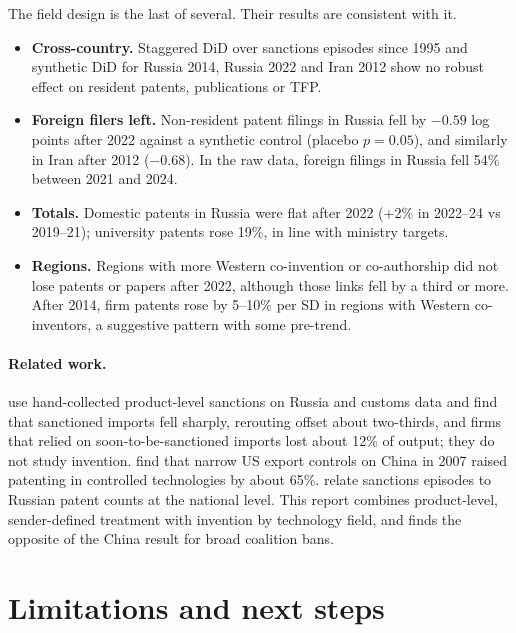 \documentclass[11pt,a4paper]{article}
\begin{document}
The field design is the last of several. Their results are consistent with it.
\begin{itemize}\setlength\itemsep{0.1em}
  \item \textbf{Cross-country.} Staggered DiD over sanctions episodes since 1995 and synthetic DiD for Russia 2014,
  Russia 2022 and Iran 2012 show no robust effect on resident patents, publications or TFP.
  \item \textbf{Foreign filers left.} Non-resident patent filings in Russia fell by $-0.59$ log points after 2022
  against a synthetic control (placebo $p=0.05$), and similarly in Iran after 2012 ($-0.68$). In the raw data,
  foreign filings in Russia fell 54\% between 2021 and 2024.
  \item \textbf{Totals.} Domestic patents in Russia were flat after 2022 (+2\% in 2022--24 vs 2019--21);
  university patents rose 19\%, in line with ministry targets.
  \item \textbf{Regions.} Regions with more Western co-invention or co-authorship did not lose patents or papers
  after 2022, although those links fell by a third or more. After 2014, firm patents rose by 5--10\% per SD in
  regions with Western co-inventors, a suggestive pattern with some pre-trend.
\end{itemize}

\paragraph{Related work.} \citet{EgorovEtAl2026} use hand-collected product-level sanctions on Russia and
customs data and find that sanctioned imports fell sharply, rerouting offset about two-thirds, and firms that
relied on soon-to-be-sanctioned imports lost about 12\% of output; they do not study invention.
\citet{LiuLiuMakarinWen2025} find that narrow US export controls on China in 2007 raised patenting in controlled
technologies by about 65\%. \citet{HovhannisyanMiromanova2025} relate sanctions episodes to Russian patent counts
at the national level. This report combines product-level, sender-defined treatment with invention by
technology field, and finds the opposite of the China result for broad coalition bans.

\section{Limitations and next steps}
\end{document}

